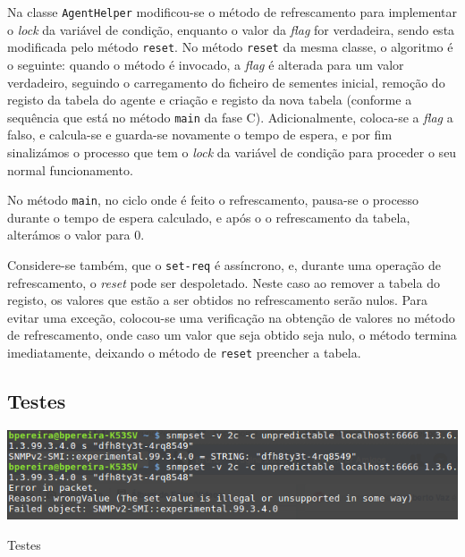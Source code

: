 Na classe \texttt{AgentHelper} modificou-se o método de refrescamento para
implementar o \emph{lock} da variável de condição, enquanto o valor da
\emph{flag} for verdadeira, sendo esta modificada pelo método \texttt{reset}. No
método \texttt{reset} da mesma classe, o algoritmo é o seguinte: quando o método
é invocado, a \emph{flag} é alterada para um valor verdadeiro, seguindo
o carregamento do ficheiro de sementes inicial, remoção do registo da tabela do
agente e criação e registo da nova tabela (conforme a sequência que está no
método \texttt{main} da fase C). Adicionalmente, coloca-se a \emph{flag}
a falso, e calcula-se e guarda-se novamente o tempo de espera, e por fim
sinalizámos o processo que tem o \emph{lock} da variável de condição para
proceder o seu normal funcionamento. 

No método \texttt{main}, no ciclo onde é feito o refrescamento, pausa-se
o processo durante o tempo de espera calculado, e após o o refrescamento da
tabela, alterámos o valor para 0. 

Considere-se também, que o \texttt{set-req} é assíncrono, e, durante uma
operação de refrescamento, o \emph{reset} pode ser despoletado. Neste caso ao
remover a tabela do registo, os valores que estão a ser obtidos no refrescamento
serão nulos. Para evitar uma exceção, colocou-se uma verificação na obtenção de
valores no método de refrescamento, onde caso um valor que seja obtido seja
nulo, o método termina imediatamente, deixando o método de \texttt{reset}
preencher a tabela.  




\subsection{Testes}

\begin{center}
 	
 	\includegraphics[width=\textwidth,height=\textheight,keepaspectratio]{resources/images/faseE/faseE.png}
 	\captionsetup{type=figure, width=0.8\linewidth}
	\caption{Testes}
\label{fig:faseB:teste} 
\end{center}



